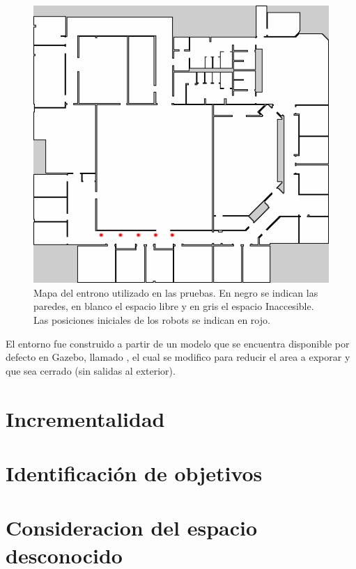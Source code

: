 \begin{figure}[H]
  \center
  \includegraphics[width=0.5\linewidth]{imagenes/willow/0_250000mRobots2.png}
  \caption[Mapa del entrono utilizado en las pruebas.]{Mapa del entrono utilizado en las pruebas. En negro se indican las paredes, en blanco el espacio libre y en gris el espacio Inaccesible. Las posiciones iniciales de los robots se indican en rojo.}
  \label{fig:willow}
\end{figure} 

El entorno fue construido a partir de un modelo que se encuentra disponible por
defecto en Gazebo, llamado , el cual se modifico para
reducir el area a exporar y que sea cerrado (sin salidas al exterior).






\section{Incrementalidad}\label{sec:exp:inc}

\section{Identificación de objetivos}\label{sec:exp:idobj}

\section{Consideracion del espacio desconocido}\label{sec:exp:desco}

